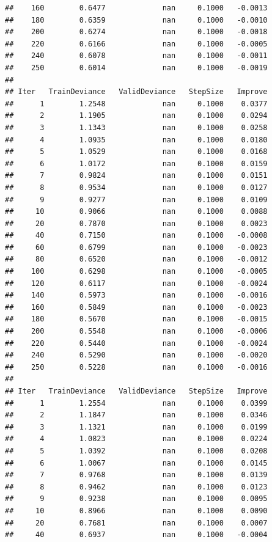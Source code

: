 \documentclass[]{book}
\begin{document}
\begin{verbatim}
##    160        0.6477             nan     0.1000   -0.0013
##    180        0.6359             nan     0.1000   -0.0010
##    200        0.6274             nan     0.1000   -0.0018
##    220        0.6166             nan     0.1000   -0.0005
##    240        0.6078             nan     0.1000   -0.0011
##    250        0.6014             nan     0.1000   -0.0019
## 
## Iter   TrainDeviance   ValidDeviance   StepSize   Improve
##      1        1.2548             nan     0.1000    0.0377
##      2        1.1905             nan     0.1000    0.0294
##      3        1.1343             nan     0.1000    0.0258
##      4        1.0935             nan     0.1000    0.0180
##      5        1.0529             nan     0.1000    0.0168
##      6        1.0172             nan     0.1000    0.0159
##      7        0.9824             nan     0.1000    0.0151
##      8        0.9534             nan     0.1000    0.0127
##      9        0.9277             nan     0.1000    0.0109
##     10        0.9066             nan     0.1000    0.0088
##     20        0.7870             nan     0.1000    0.0023
##     40        0.7150             nan     0.1000   -0.0008
##     60        0.6799             nan     0.1000   -0.0023
##     80        0.6520             nan     0.1000   -0.0012
##    100        0.6298             nan     0.1000   -0.0005
##    120        0.6117             nan     0.1000   -0.0024
##    140        0.5973             nan     0.1000   -0.0016
##    160        0.5849             nan     0.1000   -0.0023
##    180        0.5670             nan     0.1000   -0.0015
##    200        0.5548             nan     0.1000   -0.0006
##    220        0.5440             nan     0.1000   -0.0024
##    240        0.5290             nan     0.1000   -0.0020
##    250        0.5228             nan     0.1000   -0.0016
## 
## Iter   TrainDeviance   ValidDeviance   StepSize   Improve
##      1        1.2554             nan     0.1000    0.0399
##      2        1.1847             nan     0.1000    0.0346
##      3        1.1321             nan     0.1000    0.0199
##      4        1.0823             nan     0.1000    0.0224
##      5        1.0392             nan     0.1000    0.0208
##      6        1.0067             nan     0.1000    0.0145
##      7        0.9768             nan     0.1000    0.0139
##      8        0.9462             nan     0.1000    0.0123
##      9        0.9238             nan     0.1000    0.0095
##     10        0.8966             nan     0.1000    0.0090
##     20        0.7681             nan     0.1000    0.0007
##     40        0.6937             nan     0.1000   -0.0004

\end{verbatim}
\end{document}
